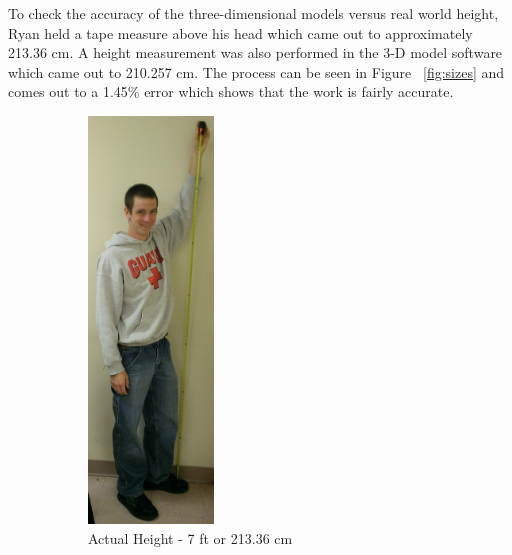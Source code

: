 \documentclass[pdftex,10.5pt]{report}
\begin{document}
To check the accuracy of the three-dimensional models versus real world height, Ryan held a tape measure above his head which came out to approximately 213.36 cm. A height measurement was also performed in the 3-D model software which came out to 210.257 cm. The process can be seen in Figure ~\ref{fig:sizes} and comes out to a 1.45\% error which shows that the work is fairly accurate.

\begin{figure}[H]
	\centering
	\begin{subfigure}[H]{0.4\textwidth}
		\includegraphics[height=108mm, width=\textwidth]{figures/ryanmeasure}
		\caption{Actual Height - 7 ft or 213.36 cm}
	\end{subfigure}
	\begin{subfigure}[H]{0.4\textwidth}

\end{subfigure}
\end{figure}
\end{document}
